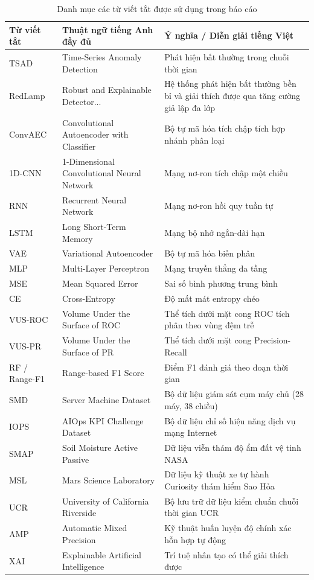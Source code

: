 \documentclass[11pt,journal,onecolumn]{IEEEtran}
\begin{document}
\begin{table}[htbp]
\centering
\caption{Danh mục các từ viết tắt được sử dụng trong báo cáo}
\label{tab:abbreviations}
\begin{tabular}{llp{7.5cm}}
\toprule
\textbf{Từ viết tắt} & \textbf{Thuật ngữ tiếng Anh đầy đủ} & \textbf{Ý nghĩa / Diễn giải tiếng Việt} \\
\midrule
TSAD & Time-Series Anomaly Detection & Phát hiện bất thường trong chuỗi thời gian \\
RedLamp & Robust and Explainable Detector... & Hệ thống phát hiện bất thường bền bỉ và giải thích được qua tăng cường giả lập đa lớp \\
ConvAEC & Convolutional Autoencoder with Classifier & Bộ tự mã hóa tích chập tích hợp nhánh phân loại \\
1D-CNN & 1-Dimensional Convolutional Neural Network & Mạng nơ-ron tích chập một chiều \\
RNN & Recurrent Neural Network & Mạng nơ-ron hồi quy tuần tự \\
LSTM & Long Short-Term Memory & Mạng bộ nhớ ngắn-dài hạn \\
VAE & Variational Autoencoder & Bộ tự mã hóa biến phân \\
MLP & Multi-Layer Perceptron & Mạng truyền thẳng đa tầng \\
MSE & Mean Squared Error & Sai số bình phương trung bình \\
CE & Cross-Entropy & Độ mất mát entropy chéo \\
VUS-ROC & Volume Under the Surface of ROC & Thể tích dưới mặt cong ROC tích phân theo vùng đệm trễ \\
VUS-PR & Volume Under the Surface of PR & Thể tích dưới mặt cong Precision-Recall \\
RF / Range-F1 & Range-based F1 Score & Điểm F1 đánh giá theo đoạn thời gian \\
SMD & Server Machine Dataset & Bộ dữ liệu giám sát cụm máy chủ (28 máy, 38 chiều) \\
IOPS & AIOps KPI Challenge Dataset & Bộ dữ liệu chỉ số hiệu năng dịch vụ mạng Internet \\
SMAP & Soil Moisture Active Passive & Dữ liệu viễn thám độ ẩm đất vệ tinh NASA \\
MSL & Mars Science Laboratory & Dữ liệu kỹ thuật xe tự hành Curiosity thám hiểm Sao Hỏa \\
UCR & University of California Riverside & Bộ lưu trữ dữ liệu kiểm chuẩn chuỗi thời gian UCR \\
AMP & Automatic Mixed Precision & Kỹ thuật huấn luyện độ chính xác hỗn hợp tự động \\
XAI & Explainable Artificial Intelligence & Trí tuệ nhân tạo có thể giải thích được \\
\bottomrule
\end{tabular}
\end{table}
\end{document}
